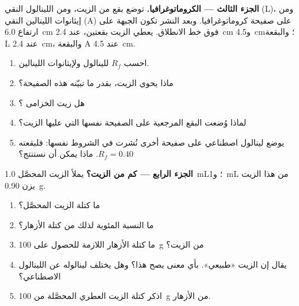 \begin{problem}
\medskip
\noindent\textbf{الجزء الثالث --- الكروماتوغرافيا.}
توضع بقع من الزيت، ومن اللينالول النقي (L)، ومن إيثانوات اللينالين النقي (A) على
صفيحة كروماتوغرافيا. وبعد النشر تكون الجبهة على ارتفاع \qty{6.0}{cm} فوق خط
الانطلاق. يعطي الزيت بقعتين، عند \qty{2.4}{cm}
و\qty{4.5}{cm}؛ والبقعة L عند \qty{2.4}{cm}، والبقعة A عند \qty{4.5}{cm}.
\begin{enumerate}[resume]
  \item احسب $R_f$ للينالول ولإيثانوات اللينالين.
  \item ماذا يحوي الزيت، بقدر ما تبيّنه هذه الصفيحة؟
  \item هل زيت الخزامى ؟
  \item لماذا وُضعت البقع المرجعية على الصفيحة نفسها التي عليها الزيت؟
  \item يوضع لينالول اصطناعي على صفيحة أخرى نُشرت في الشروط
        نفسها: فلبقعته $R_f = 0.40$. ماذا يمكن أن نستنتج؟
\end{enumerate}

\medskip
\noindent\textbf{الجزء الرابع --- كم من الزيت؟}
يملأ الزيت المحصَّل \qty{1.0}{mL}؛ و\qty{1}{mL} من هذا الزيت يزن
\qty{0.90}{g}.
\begin{enumerate}[resume]
  \item ما كتلة الزيت المحصَّل؟
  \item ما النسبة المئوية لذلك من كتلة الأزهار؟
  \item ما كتلة الأزهار اللازمة للحصول على \qty{100}{g} من الزيت؟
  \item يقال إن الزيت «طبيعي». بأي معنى يصح هذا؟ وهل يختلف لينالوله
        عن اللينالول الاصطناعي؟
  \item اذكر كتلة الزيت العطري المحصَّلة من \qty{100}{g} من
        الأزهار.
\end{enumerate}
\end{problem}
